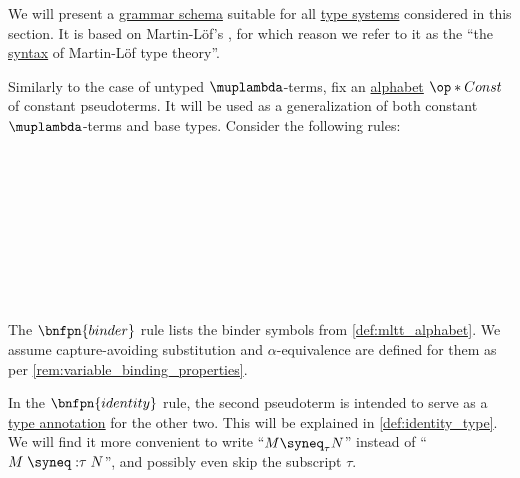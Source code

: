 \begin{definition}\label{def:mltt_pseudoterm}\mimprovised
  We will present a \hyperref[def:formal_grammar/schema]{grammar schema} suitable for all \hyperref[def:abstract_type_system]{type systems} considered in this section. It is based on Martin-L\"of's \cite{MartinLöf1984IntuitionisticTypeTheory}, for which reason we refer to it as the \enquote{the \hyperref[con:syntax_semantics_duality]{syntax} of Martin-L\"of type theory}.

  Similarly to the case of untyped \( \muplambda \)-terms, fix an \hyperref[def:formal_language/alphabet]{alphabet} \( \op*{Const} \) of constant pseudoterms. It will be used as a generalization of both constant \( \muplambda \)-terms and base types. Consider the following rules:

  \begin{bnf*}
               {} \\
                   { \bnfor {}} \\
     { \bnfsp \bnftsq{:} \bnfsp {}} \\
            {\bnftsq{\( ( \)} \bnfsp {} \bnfsp {} \bnfsp \bnftsq{\( ) \)}} \\
                 {\bnftsq{\( \synlambda \)} \bnfor \bnftsq{\( \synprod \)} \bnfor \bnftsq{\( \synsum \)}} \\
      {\bnftsq{\( ( \)} \bnfsp {} \bnfsp {} \bnfsp {} \bnfsp {} \bnfsp \bnftsq{\( ) \)}} \\
               {\bnftsq{\( ( \)} \bnfsp {} \bnfsp \bnftsq{\( \syneq \)} \bnfsp \bnftsq{\( : \)} \bnfsp {} \bnfsp {} \bnfsp \bnftsq{\( ) \)}} \\
             { \bnfor {}\bnfor {} \bnfor {} \bnfor} \\
  \end{bnf*}

  The \( \bnfpn{binder} \) rule lists the binder symbols from \cref{def:mltt_alphabet}. We assume capture-avoiding substitution and \( \alpha \)-equivalence are defined for them as per \cref{rem:variable_binding_properties}.

  In the \( \bnfpn{identity} \) rule, the second pseudoterm is intended to serve as a \hyperref[con:type_annotation]{type annotation} for the other two. This will be explained in \cref{def:identity_type}. We will find it more convenient to write \enquote{\( M \syneq_\tau N \)} instead of \enquote{\( M \mathrel{{\syneq:} \tau} N \)}, and possibly even skip the subscript \( \tau \).
\end{definition}
